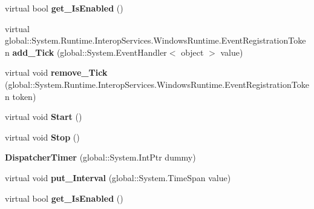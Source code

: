 \begin{DoxyCompactItemize}
\item 
\mbox{\label{class_windows_1_1_u_i_1_1_xaml_1_1_dispatcher_timer_aa01da6df2d38218542106e2b5024d1ad}} 
virtual bool {\bfseries get\+\_\+\+Is\+Enabled} ()
\item 
\mbox{\label{class_windows_1_1_u_i_1_1_xaml_1_1_dispatcher_timer_afec18a9d2af7458ea713ce3d73bf8fc8}} 
virtual global\+::\+System.\+Runtime.\+Interop\+Services.\+Windows\+Runtime.\+Event\+Registration\+Token {\bfseries add\+\_\+\+Tick} (global\+::\+System.\+Event\+Handler$<$ object $>$ value)
\item 
\mbox{\label{class_windows_1_1_u_i_1_1_xaml_1_1_dispatcher_timer_a2dead21112a95b1c2d77308cd76f9917}} 
virtual void {\bfseries remove\+\_\+\+Tick} (global\+::\+System.\+Runtime.\+Interop\+Services.\+Windows\+Runtime.\+Event\+Registration\+Token token)
\item 
\mbox{\label{class_windows_1_1_u_i_1_1_xaml_1_1_dispatcher_timer_ace863a2c747bd7aa446b55fd38eaca7e}} 
virtual void {\bfseries Start} ()
\item 
\mbox{\label{class_windows_1_1_u_i_1_1_xaml_1_1_dispatcher_timer_a8465a583b290d1ba135b41f118bb7e91}} 
virtual void {\bfseries Stop} ()
\item 
\mbox{\label{class_windows_1_1_u_i_1_1_xaml_1_1_dispatcher_timer_a46c10638999c5f9db1a7102ce752b5e1}} 
{\bfseries Dispatcher\+Timer} (global\+::\+System.\+Int\+Ptr dummy)
\item 
\mbox{\label{class_windows_1_1_u_i_1_1_xaml_1_1_dispatcher_timer_a87fbb85d7540c9ede1de8c5586bab52b}} 
virtual void {\bfseries put\+\_\+\+Interval} (global\+::\+System.\+Time\+Span value)
\item 
\mbox{\label{class_windows_1_1_u_i_1_1_xaml_1_1_dispatcher_timer_aa01da6df2d38218542106e2b5024d1ad}} 
virtual bool {\bfseries get\+\_\+\+Is\+Enabled} ()

\end{DoxyCompactItemize}
